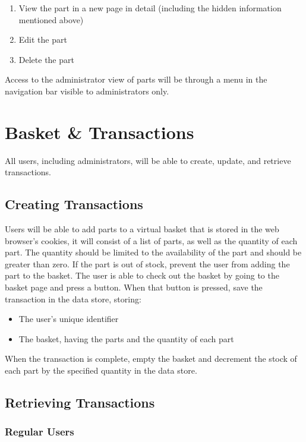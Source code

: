 \documentclass[12pt, letterpaper]{article}
\begin{document}
\begin{enumerate}
  \item View the part in a new page in detail (including the hidden information mentioned above)
  \item Edit the part
  \item Delete the part
\end{enumerate}

Access to the administrator view of parts will be through a menu in the navigation bar visible to administrators only.

\section{Basket \& Transactions}

All users, including administrators, will be able to create, update, and retrieve transactions.

\subsection{Creating Transactions}

Users will be able to add parts to a virtual basket that is stored in the web browser's cookies, it will consist of a list of parts, as well as the quantity of each part. The quantity should be limited to the availability of the part and should be greater than zero. If the part is out of stock, prevent the user from adding the part to the basket. The user is able to check out the basket by going to the basket page and press a button. When that button is pressed, save the transaction in the data store, storing:

\begin{itemize}
  \item The user's unique identifier
  \item The basket, having the parts and the quantity of each part
\end{itemize}

When the transaction is complete, empty the basket and decrement the stock of each part by the specified quantity in the data store.

\subsection{Retrieving Transactions}

\subsubsection{Regular Users}
\end{document}
